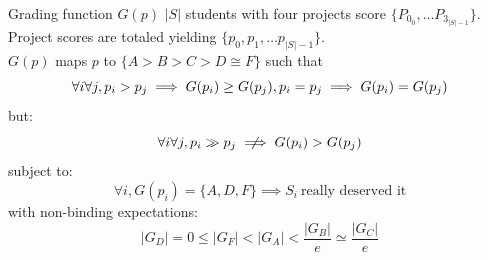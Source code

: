 \documentclass[handout]{beamer}
\begin{document}
\begin{frame}{Grading function $G(p)$}
$|S|$ students with four projects score $\{P_{0_0}, \dotsc P_{3_{|S| - 1}}\}$.\linebreak \\
Project scores are totaled yielding $\{p_0, p_1, \dotsc p_{|S| - 1}\}$.\linebreak \\
$G(p)$ maps $p$ to $\{A > B > C > D \cong F\}$ such that
\begin{equation}
\forall i \forall j,  p_i > p_j \implies G(p_i) \ge G(p_j),
p_i = p_j \implies G(p_i) = G(p_j) \nonumber \linebreak
\end{equation}
but:
\begin{equation}
\forall i \forall j,  p_i\gg p_j \centernot\implies G(p_i) > G(p_j) \nonumber
\end{equation}
subject to:
\begin{equation}
\forall i,  G(p_i) = \{A, D, F\} \implies S_i\ \text{really deserved it}\nonumber
\end{equation}
with non-binding expectations:
\begin{equation}
|G_D| = 0 \le |G_F| < |G_A| < \frac{|G_B|}{e} \simeq \frac{|G_C|}{e} \nonumber
\end{equation}
\end{frame}
\end{document}
